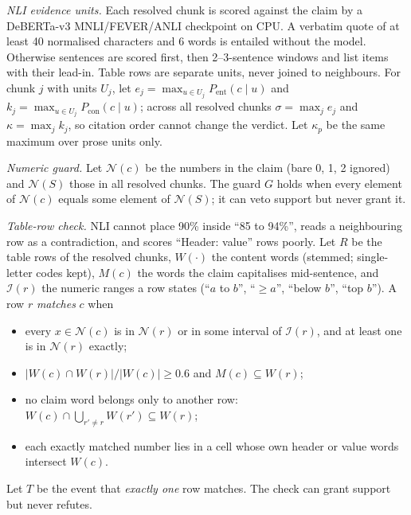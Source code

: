 \documentclass[conference]{IEEEtran}
\begin{document}
\textit{NLI evidence units.} Each resolved chunk is scored against the claim by a DeBERTa-v3
MNLI/FEVER/ANLI checkpoint on CPU. A verbatim quote of at least 40 normalised characters and 6 words is
entailed without the model. Otherwise sentences are scored first, then 2--3-sentence windows and list items
with their lead-in. Table rows are separate units, never joined to neighbours. For chunk $j$ with units
$U_j$, let $e_j=\max_{u\in U_j}P_{\mathrm{ent}}(c\mid u)$ and $k_j=\max_{u\in U_j}P_{\mathrm{con}}(c\mid u)$;
across all resolved chunks $\sigma=\max_j e_j$ and $\kappa=\max_j k_j$, so citation order cannot change the
verdict. Let $\kappa_p$ be the same maximum over prose units only.

\textit{Numeric guard.} Let $\mathcal{N}(c)$ be the numbers in the claim (bare 0, 1, 2 ignored) and
$\mathcal{N}(S)$ those in all resolved chunks. The guard $G$ holds when every element of $\mathcal{N}(c)$
equals some element of $\mathcal{N}(S)$; it can veto support but never grant it.

\textit{Table-row check.} NLI cannot place 90\% inside ``85 to 94\%'', reads a neighbouring row as a
contradiction, and scores ``Header: value'' rows poorly. Let $R$ be the table rows of the resolved chunks,
$W(\cdot)$ the content words (stemmed; single-letter codes kept), $M(c)$ the words the claim capitalises
mid-sentence, and $\mathcal{I}(r)$ the numeric ranges a row states (``$a$ to $b$'', ``$\ge a$'',
``below $b$'', ``top $b$''). A row $r$ \emph{matches} $c$ when
\begin{itemize}
\item every $x\in\mathcal{N}(c)$ is in $\mathcal{N}(r)$ or in some interval of $\mathcal{I}(r)$, and at least
one is in $\mathcal{N}(r)$ exactly;
\item $|W(c)\cap W(r)|/|W(c)|\ge 0.6$ and $M(c)\subseteq W(r)$;
\item no claim word belongs only to another row: $W(c)\cap\bigcup_{r'\neq r}W(r')\subseteq W(r)$;
\item each exactly matched number lies in a cell whose own header or value words intersect $W(c)$.
\end{itemize}
Let $T$ be the event that \emph{exactly one} row matches. The check can grant support but never refutes.
\end{document}
